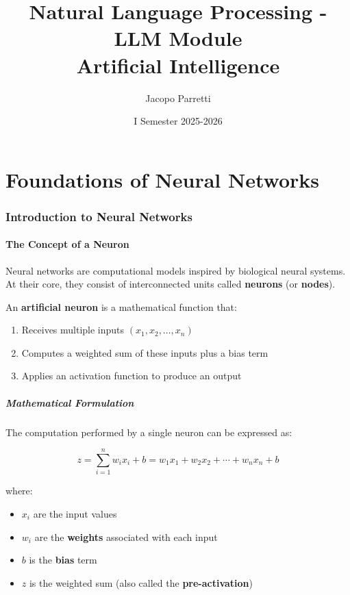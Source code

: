 \documentclass[11pt,a4paper]{article}
\title{\textbf{Natural Language Processing - LLM Module}\\
\large Artificial Intelligence}
\author{Jacopo Parretti}
\date{I Semester 2025-2026}
\theoremstyle{definition}
\theoremstyle{plain}
\theoremstyle{remark}
\begin{document}
\maketitle
\newpage
\tableofcontents
\newpage


\part{Foundations of Neural Networks}

\section{Introduction to Neural Networks}

\subsection{The Concept of a Neuron}

Neural networks are computational models inspired by biological neural systems. At their core, they consist of interconnected units called \textbf{neurons} (or \textbf{nodes}).

\begin{tcolorbox}[colback=blue!5!white,colframe=blue!75!black,title=\textbf{Definition: Artificial Neuron}]
An \textbf{artificial neuron} is a mathematical function that:
\begin{enumerate}
    \item Receives multiple inputs $(x_1, x_2, \dots, x_n)$
    \item Computes a weighted sum of these inputs plus a bias term
    \item Applies an activation function to produce an output
\end{enumerate}
\end{tcolorbox}

\subsubsection{Mathematical Formulation}

The computation performed by a single neuron can be expressed as:

\[
z = \sum_{i=1}^{n} w_i x_i + b = w_1 x_1 + w_2 x_2 + \cdots + w_n x_n + b
\]

where:
\begin{itemize}
    \item $x_i$ are the input values
    \item $w_i$ are the \textbf{weights} associated with each input
    \item $b$ is the \textbf{bias} term
    \item $z$ is the weighted sum (also called the \textbf{pre-activation})
\end{itemize}
\end{document}
